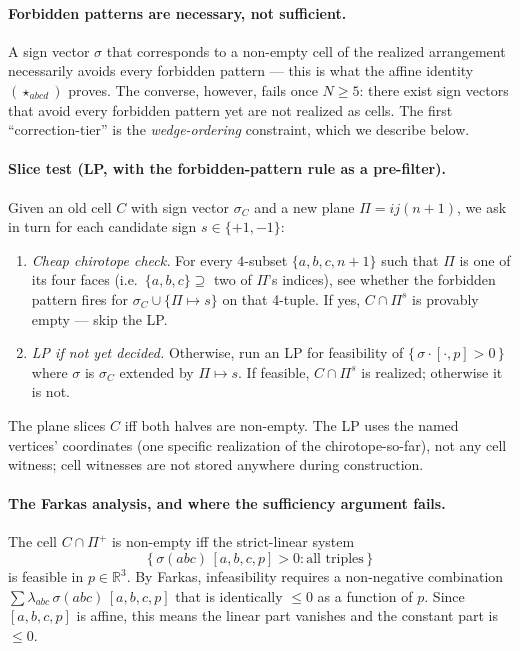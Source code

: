 \documentclass[11pt]{article}
\begin{document}
\paragraph{Forbidden patterns are necessary, not sufficient.} A sign vector
$\sigma$ that corresponds to a non-empty cell of the realized arrangement
necessarily avoids every forbidden pattern --- this is what the affine
identity $(\star_{abcd})$ proves. The converse, however, fails once $N\ge
5$: there exist sign vectors that avoid every forbidden pattern yet are
not realized as cells. The first ``correction-tier'' is the
\emph{wedge-ordering} constraint, which we describe below.

\paragraph{Slice test (LP, with the forbidden-pattern rule as a pre-filter).}
Given an old cell $C$ with sign vector $\sigma_C$ and a new plane
$\Pi = ij(n{+}1)$, we ask in turn for each candidate sign $s\in\{+1,-1\}$:

\begin{enumerate}
  \item \emph{Cheap chirotope check.} For every $4$-subset
  $\{a,b,c,n{+}1\}$ such that $\Pi$ is one of its four faces (i.e.\
  $\{a,b,c\}\supseteq$ two of $\Pi$'s indices), see whether the forbidden
  pattern fires for $\sigma_C\cup\{\Pi\!\mapsto\!s\}$ on that 4-tuple.
  If yes, $C\cap\Pi^s$ is provably empty --- skip the LP.
  \item \emph{LP if not yet decided.} Otherwise, run an LP for feasibility
  of $\{\,\sigma\!\cdot\![\cdot,p]>0\,\}$ where $\sigma$ is $\sigma_C$
  extended by $\Pi\!\mapsto\!s$. If feasible, $C\cap\Pi^s$ is realized;
  otherwise it is not.
\end{enumerate}
The plane slices $C$ iff both halves are non-empty. The LP uses the named
vertices' coordinates (one specific realization of the chirotope-so-far),
not any cell witness; cell witnesses are not stored anywhere during
construction.

\paragraph{The Farkas analysis, and where the sufficiency argument fails.}
The cell $C\cap\Pi^+$ is non-empty iff the strict-linear system
\[
\bigl\{\,\sigma(abc)\,[a,b,c,p] > 0 : \text{all triples}\,\bigr\}
\]
is feasible in $p\in\mathbb{R}^3$. By Farkas, infeasibility requires a
non-negative combination $\sum \lambda_{abc}\,\sigma(abc)\,[a,b,c,p]$ that is
identically $\le 0$ as a function of $p$. Since $[a,b,c,p]$ is affine, this
means the linear part vanishes and the constant part is $\le 0$.
\end{document}
